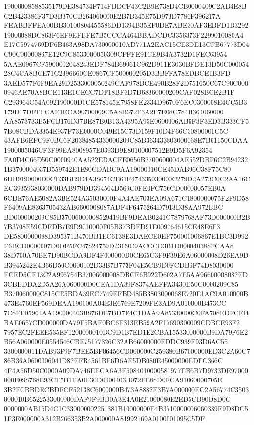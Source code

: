\documentclass[UTF8,fontset=fandol,zihao=-4,a4paper]{ctexart}
\begin{document}
{{19000008588535179DE384734F714FBDCF43C2B9E738D4CB0000409C2AB4E8BC2B423386F37D3B370CB264060000E2B7B345E75D973D7786F396217A
FEABBFFEA00BB30100804455586DD1394B35EF0DE7ABE30AF3EBFD1B329219000088DC863F6EF9EFBFE7B5CCCA464BBADCDC3356373F2299010080A4
E17C5974769DF6B463A98DA730000010AD771A2EAC15CE3DE13CFB67773D04C90C00000867E12C9C8533000050309CFFFE91CE9B4A3732D1FEC63954
5AAE0967CF5900002048243EDF784B69061C962D911E3030BFDE13D50C00005428C4CA8BCE71C2396660CE0867CF500000205D3BBFFA78EDBCE1B3FD
3AED577F6F9EA29D2533000050249CAF978BCE490B28F2D751650C67C90C0000946AE70A8BCE113E1CECC7DF18BF3D7D68360000209CAF028BCE2B1F
C293964C54A092190000D0CE578145E7958FE2334D9670F6EC0300008E4CC5B3179D17DFFFCAE1ECA90700009C5A8B672F3A2F7E08C784B364060000
AA8573733B5FCB176D37BE87B0B13A4395A95E0600006AB6F3F3ED3B333CF57B08CBDA3354E937F73E0000C049E15C73D159F10D4F66C30800001C5C
43AFB6EFC9F0BC6F20384854330000209C85B363433803000068E7B61150CDAA1900005046CF3F99EA8008957E0393D9E80100007512E9D5F6A92354
FA0D4C66D50C0000940AA522EDACFE0656B3700600004AE552DBF6C2B942321B3700004037D559742E1E80CDABC9AA19000010CE45DAB96C38F75C80
6DB9190000D0CE33BE9D4A38674CE61F474335030000C279D2A273C0C2AA16CEC3935938030000DAB979DD394564D569C0FE0FC756CD00000057EB0A
6CDE76AE5082A3BE524A35030000F4A4AE703EA09A671C1800000075F2F9D58F6409AE8363705432AB6600008087ADF4F6475264D7913D38AA972BBC
BD000000209C85B37006000008529419BF9DEAB0241C7879768AF73D000000B2B7B3708E59CDFDB7E9D9010000F05B37BDFD91E009764615CE48E6F3
DE5800000088D395371B470BB1EC6138E3DAECE0EF750000006867E1BC3D992F6BCD0000007D0DF5FC47824759D23C9C9ACCCD3B1D000040388FCAA8
38D700A70BE7D90BCDA9DF4F000000D0CE65C3F9F39E6A06000008D26EA9DB3945242E4B66D50C0000102D33B7B773F04E5CB9D0FCDB6F74D8030000
ECED5CE13C2A996754B37006000008DBCE6B922D602A7E5AA96600008082ED3CBBDDA2D5A26A060000D0CEA1DA39F8374AEFFA3430D50C0000209C85
B370060000C815CE5BDA39EC7749EFBD485B3803000068E720E1AC9A010000B473E4760EF569DEAA190000A04E3E6769E7209FE3AD9A010000B473CC
7C8EF05964AA190000403B876DE7BD7F4C1DAA9A85330000C0FA708EDFCEBBAE0657CD000000DA79F6BAF0BC6F313EB59A2F17690300009CDBCE93F2
7957EC2FEEE535EF1200000010BC9D1B7ED1E2CBA15533000000B9DA79F6E2B56A060000E0554546CBE75177326C32AB66000000EDDC939F93D6AC55
3300000011DAB93F9F7BEE5BF06456CD000000C259380B67000000ED3C2A60C786B36A0600006041D82EFB4561BF6D6AE5DB080E45000000EDFC366C
4F4A66D50C0000A09DA746EECA6A3E6084010000581977EB6B7D9733DE97000000E098768E93CF5B1EA0E30D0000403B072FE88D0FCA91060000705E
3B2FCBBDECBDFCF52138C6000000B473A8882E3B7A000000EC2A56774C3503000010B6522533000000DAF9F9BD0A3E4A0E21000080E2ED5CB90D8D0C
0000000AB16D4C1C330000002251381B10000000E4B3710000006060339E9D8DC51F3E000000A312B266353B2A000000A81992169A0100001095C5DF
}}
\end{document}

